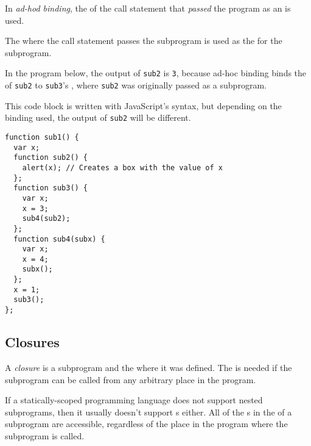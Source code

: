 \begin{definition}\label{def:Ad_Hoc_Binding}
  In \emph{ad-hod binding}, the  of the call statement that \emph{passed} the program as an  is used.

  The  where the call statement passes the subprogram is used as the  for the subprogram.

  \begin{remark}\label{rmk:Ad_Hoc_Binding-Program_Output}
    In the program below, the output of \texttt{sub2} is \texttt{3}, because ad-hoc binding binds the  of \texttt{sub2} to \texttt{sub3}'s , where \texttt{sub2} was originally passed as a subprogram.
  \end{remark}
\end{definition}

This code block is written with JavaScript's syntax, but depending on the binding used, the output of \texttt{sub2} will be different.
\begin{verbatim}
function sub1() {
  var x;
  function sub2() {
    alert(x); // Creates a box with the value of x
  };
  function sub3() {
    var x;
    x = 3;
    sub4(sub2);
  };
  function sub4(subx) {
    var x;
    x = 4;
    subx();
  };
  x = 1;
  sub3();
};
\end{verbatim}

\subsection{Closures}\label{subsec:Closures}
\begin{definition}[Closure]\label{def:Closure}
  A \emph{closure} is a subprogram and the  where it was defined.
  The  is needed if the subprogram can be called from any arbitrary place in the program.

  \begin{remark}
    If a statically-scoped programming language does not support nested subprograms, then it usually doesn't support s either.
    All of the s in the  of a subprogram are accessible, regardless of the place in the program where the subprogram is called.
  \end{remark}
\end{definition}

